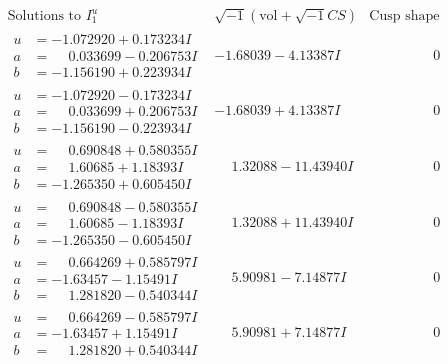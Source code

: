 \documentclass[1p]{elsarticle_modified}
\theoremstyle{definition}
\newcommand{\I}{\sqrt{-1}}
\begin{document}
$$\begin{array}{c|c|c}  
\text{Solutions to }I^u_{1}& \I (\text{vol} + \sqrt{-1}CS) & \text{Cusp shape}\\
 \hline 
\begin{aligned}
u &= -1.072920 + 0.173234 I \\
a &= \phantom{-}0.033699 - 0.206753 I \\
b &= -1.156190 + 0.223934 I\end{aligned}
 & -1.68039 - 4.13387 I & \phantom{-0.000000 } 0 \\ \hline\begin{aligned}
u &= -1.072920 - 0.173234 I \\
a &= \phantom{-}0.033699 + 0.206753 I \\
b &= -1.156190 - 0.223934 I\end{aligned}
 & -1.68039 + 4.13387 I & \phantom{-0.000000 } 0 \\ \hline\begin{aligned}
u &= \phantom{-}0.690848 + 0.580355 I \\
a &= \phantom{-}1.60685 + 1.18393 I \\
b &= -1.265350 + 0.605450 I\end{aligned}
 & \phantom{-}1.32088 - 11.43940 I & \phantom{-0.000000 } 0 \\ \hline\begin{aligned}
u &= \phantom{-}0.690848 - 0.580355 I \\
a &= \phantom{-}1.60685 - 1.18393 I \\
b &= -1.265350 - 0.605450 I\end{aligned}
 & \phantom{-}1.32088 + 11.43940 I & \phantom{-0.000000 } 0 \\ \hline\begin{aligned}
u &= \phantom{-}0.664269 + 0.585797 I \\
a &= -1.63457 - 1.15491 I \\
b &= \phantom{-}1.281820 - 0.540344 I\end{aligned}
 & \phantom{-}5.90981 - 7.14877 I & \phantom{-0.000000 } 0 \\ \hline\begin{aligned}
u &= \phantom{-}0.664269 - 0.585797 I \\
a &= -1.63457 + 1.15491 I \\
b &= \phantom{-}1.281820 + 0.540344 I\end{aligned}
 & \phantom{-}5.90981 + 7.14877 I & \phantom{-0.000000 } 0 \\ \hline\begin{aligned}

\end{aligned}
\end{array}$$
\end{document}
